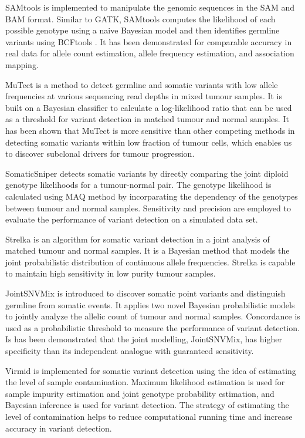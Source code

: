 \documentclass[11pt,reqno]{amsart}
\begin{document}
SAMtools \citep{Li2009a} is implemented to manipulate the genomic sequences in the SAM and BAM format.
Similar to GATK, SAMtools computes the likelihood of each possible genotype using a naive Bayesian model and then identifies germline variants using BCFtools \citep{li2011statistical}.
It has been demonstrated for comparable accuracy in real data for allele count estimation, allele frequency estimation, and association mapping.

MuTect \citep{Cibulskis2013} is a method to detect germline and somatic variants with low allele frequencies at various sequencing read depths in mixed tumour samples.
It is built on a Bayesian classifier to calculate a log-likelihood ratio that can be used as a threshold for variant detection in matched tumour and normal samples.
It has been shown that MuTect is more sensitive than other competing methods in detecting somatic variants within low fraction of tumour cells, which enables us to discover subclonal drivers for tumour progression.

SomaticSniper \citep{Larson2012} detects somatic variants by directly comparing the joint diploid genotype likelihoods for a tumour-normal pair.
The genotype likelihood is calculated using MAQ method \citep{Li2008} by  incorparating the dependency of the genotypes between tumour and normal samples.
Sensitivity and precision are employed to evaluate the performance of variant detection on a simulated data set.

Strelka \citep{Saunders2012} is an algorithm for somatic variant detection in a joint analysis of matched tumour and normal samples.
It is a Bayesian method that models the joint probabilistic distribution of continuous allele frequencies.
Strelka is capable to maintain high sensitivity in low purity tumour samples.

JointSNVMix \citep{Roth2012} is introduced to discover somatic point variants and distinguish germline from somatic events.
It applies two novel Bayesian probabilistic models to jointly analyze the allelic count of tumour and normal samples.
Concordance is used as a probabilistic threshold to measure the performance of variant detection.
Is has been demonstrated that the joint modelling, JointSNVMix, has higher specificity than its independent analogue with guaranteed sensitivity.

Virmid \citep{Kim2013} is implemented for somatic variant detection using the idea of estimating the level of sample contamination.
Maximum likelihood estimation is used for sample impurity estimation and joint genotype probability estimation, and Bayesian inference is used for variant detection.
The strategy of estimating the level of contamination helps to reduce computational running time and increase accuracy in variant detection.
\end{document}
